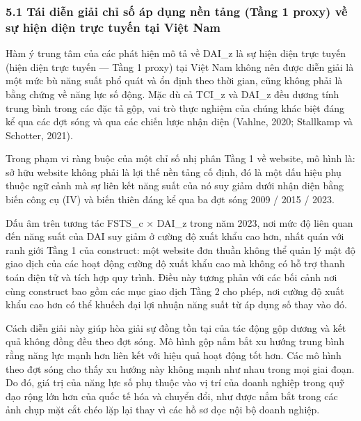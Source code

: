 \documentclass[12pt,a4paper]{article}
\begin{document}
\hypertarget{51-tuxe1i-diux1ec5n-giux1ea3i-chux1ec9-sux1ed1-uxe1p-dux1ee5ng-nux1ec1n-tux1ea3ng-tux1ea7ng-1-proxy-vux1ec1-sux1ef1-hiux1ec7n-diux1ec7n-trux1ef1c-tuyux1ebfn-tux1ea1i-viux1ec7t-nam}{%
\subsubsection{5.1 Tái diễn giải chỉ số áp dụng nền tảng (Tầng 1 proxy)
về sự hiện diện trực tuyến tại Việt
Nam}\label{51-tuxe1i-diux1ec5n-giux1ea3i-chux1ec9-sux1ed1-uxe1p-dux1ee5ng-nux1ec1n-tux1ea3ng-tux1ea7ng-1-proxy-vux1ec1-sux1ef1-hiux1ec7n-diux1ec7n-trux1ef1c-tuyux1ebfn-tux1ea1i-viux1ec7t-nam}}

Hàm ý trung tâm của các phát hiện mô tả về DAI\_z là sự hiện diện trực
tuyến (hiện diện trực tuyến --- Tầng 1 proxy) tại Việt Nam không nên
được diễn giải là một mức bù năng suất phổ quát và ổn định theo thời
gian, cũng không phải là bằng chứng về năng lực số động. Mặc dù cả
TCI\_z và DAI\_z đều dương tính trung bình trong các đặc tả gộp, vai trò
thực nghiệm của chúng khác biệt đáng kể qua các đợt sóng và qua các
chiến lược nhận diện (Vahlne, 2020; Stallkamp và Schotter, 2021).

Trong phạm vi ràng buộc của một chỉ số nhị phân Tầng 1 về website, mô
hình là: sở hữu website không phải là lợi thế nền tảng cố định, đó là
một dấu hiệu phụ thuộc ngữ cảnh mà sự liên kết năng suất của nó suy giảm
dưới nhận diện bằng biến công cụ (IV) và biến thiên đáng kể qua ba đợt
sóng 2009 / 2015 / 2023.

Dấu âm trên tương tác FSTS\_c × DAI\_z trong năm 2023, nơi mức độ liên
quan đến năng suất của DAI suy giảm ở cường độ xuất khẩu cao hơn, nhất
quán với ranh giới Tầng 1 của construct: một website đơn thuần không thể
quản lý mật độ giao dịch của các hoạt động cường độ xuất khẩu cao mà
không có hỗ trợ thanh toán điện tử và tích hợp quy trình. Điều này tương
phản với các bối cảnh nơi cùng construct bao gồm các mục giao dịch Tầng
2 cho phép, nơi cường độ xuất khẩu cao hơn có thể khuếch đại lợi nhuận
năng suất từ áp dụng số thay vào đó.

Cách diễn giải này giúp hòa giải sự đồng tồn tại của tác động gộp dương
và kết quả không đồng đều theo đợt sóng. Mô hình gộp nắm bắt xu hướng
trung bình rằng năng lực mạnh hơn liên kết với hiệu quả hoạt động tốt
hơn. Các mô hình theo đợt sóng cho thấy xu hướng này không mạnh như nhau
trong mọi giai đoạn. Do đó, giá trị của năng lực số phụ thuộc vào vị trí
của doanh nghiệp trong quỹ đạo rộng lớn hơn của quốc tế hóa và chuyển
đổi, như được nắm bắt trong các ảnh chụp mặt cắt chéo lặp lại thay vì
các hồ sơ dọc nội bộ doanh nghiệp.
\end{document}

